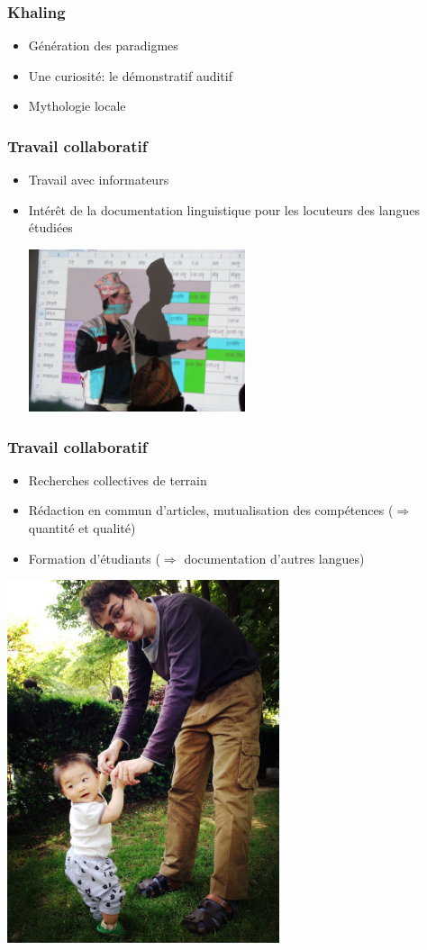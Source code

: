 \documentclass[xcolor=table]{beamer}
\begin{document}
\begin{frame} 
\frametitle{Khaling}
\begin{itemize}[<+->]
\item Génération des paradigmes 
\item Une curiosité: le démonstratif auditif
\item Mythologie locale 
\end{itemize}

\end{frame} 

\begin{frame} 
\frametitle{Travail collaboratif}
\begin{itemize}[<+->]
\item Travail avec informateurs
\item Intérêt de la documentation linguistique pour les locuteurs des langues étudiées

\includegraphics[width=0.5\textwidth]{hdr-image1.jpg}\centering
\end{itemize}

\end{frame} 

\begin{frame} 
\frametitle{Travail collaboratif}

\begin{itemize}[<+->]
\item Recherches collectives de terrain 
\item Rédaction en commun d'articles, mutualisation des compétences ($\Rightarrow$ quantité et qualité)
\item Formation d'étudiants ($\Rightarrow$ documentation d'autres langues)
\end{itemize}

\end{frame} 

\begin{frame}

\includegraphics[width=0.6\textwidth]{archi.JPG} \centering
\end{frame}   
\end{document}
